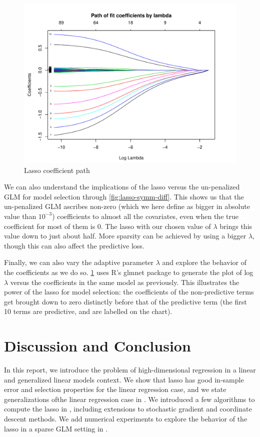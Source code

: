 \documentclass[letterpaper, 12pt]{article}
\begin{document}
\begin{figure}[tb]
\centering
\includegraphics[width=.8\textwidth]{figs/lasso-path}
\caption{Lasso coefficient path}
\label{fig:lasso-path}
\end{figure}

We can also understand the implications of the lasso versus the un-penalized GLM
for model selection through \cref{fig:lasso-symm-diff}. This shows us that the
un-penalized GLM ascribes non-zero (which we here define as bigger in absolute
value than $10^{-3}$) coefficients to almost all the covariates, even when the
true coefficient for most of them is 0. The lasso with our chosen value of
$\lambda$ brings this value down to just about half. More sparsity can be
achieved by using a bigger $\lambda$, though this can also affect the predictive
loss.


Finally, we can also vary the adaptive parameter $\lambda$ and explore the
behavior of the coefficients as we do so. \cref{fig:lasso-path} uses R's
\textsf{glmnet} package to generate the plot of log $\lambda$ versus the
coefficients in the same model as previously. This illustrates the power of the
lasso for model selection: the coefficients of the non-predictive terms get
brought down to zero distinctly before that of the predictive term (the first 10
terms are predictive, and are labelled on the chart).

\section{Discussion and Conclusion}
\label{sec:conc}
In this report, we introduce the problem of high-dimensional regression in a
linear and generalized linear models context. We show that lasso has good
in-sample error and selection properties for the linear regression case, and we
state generalizations ofthe linear regression case in . We
introduced a few algorithms to compute the lasso in ,
including extensions to stochastic gradient and coordinate descent methods. We
 add numerical experiments to explore the behavior of the lasso in a sparse GLM
 setting in .  %
\newpage


\end{document}
